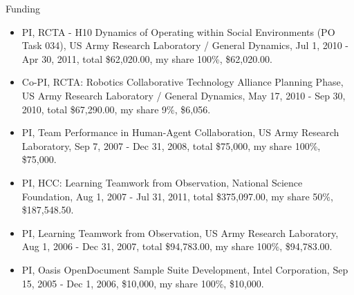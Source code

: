 \begin{category}{Funding}
\begin{itemize}
\item PI, RCTA - H10 Dynamics of Operating within Social Environments (PO Task  034), US Army Research Laboratory / General Dynamics, Jul 1, 2010 - Apr 30, 2011, total \$62,020.00, my share 100\%, \$62,020.00.

\item Co-PI, RCTA: Robotics Collaborative Technology Alliance Planning Phase, US Army Research Laboratory / General Dynamics, May 17, 2010 - Sep 30, 2010, total \$67,290.00, my share 9\%, \$6,056.

\item PI, Team Performance in Human-Agent Collaboration, US Army Research Laboratory, Sep 7, 2007 - Dec 31, 2008, total \$75,000, my share 100\%, \$75,000.

\item PI, HCC: Learning Teamwork from Observation, National Science Foundation, Aug 1, 2007 - Jul 31, 2011, total \$375,097.00, my share 50\%, \$187,548.50.

\item PI, Learning Teamwork from Observation, US Army Research Laboratory, Aug 1, 2006 - Dec 31, 2007, total \$94,783.00, my share 100\%, \$94,783.00.

\item PI, Oasis OpenDocument Sample Suite Development, Intel Corporation, Sep 15, 2005 - Dec 1, 2006, \$10,000, my share 100\%, \$10,000.

\end{itemize}

\end{category}
